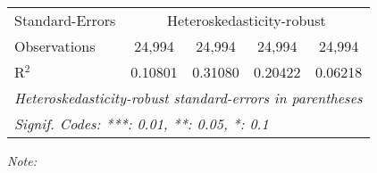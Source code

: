 \begin{table}[htbp!]
\begin{adjustbox}{width = 1\textwidth, max height = 0.95\textheight, center}
\begin{threeparttable}[b]
\begin{tabular}{lcccc}
            \midrule 
            Standard-Errors & \multicolumn{4}{c}{Heteroskedasticity-robust} \\ 
            Observations         & 24,994                         & 24,994                         & 24,994                          & 24,994\\  
            R$^2$                & 0.10801                        & 0.31080                        & 0.20422                         & 0.06218\\  
            \midrule \midrule
            \multicolumn{5}{l}{\emph{Heteroskedasticity-robust standard-errors in parentheses}}\\
            \multicolumn{5}{l}{\emph{Signif. Codes: ***: 0.01, **: 0.05, *: 0.1}}\\
         \end{tabular}
         
         \begin{tablenotes}\item \medskip \textit{Note:}
         \end{tablenotes}
      \end{threeparttable}
   \end{adjustbox}
\end{table}


